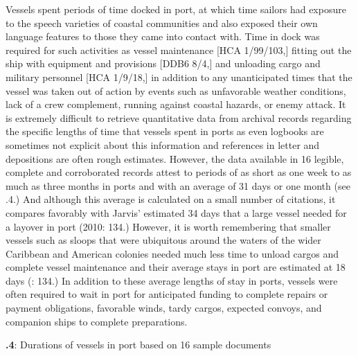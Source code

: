 Vessels spent periods of time docked in port, at which time sailors had exposure to the speech varieties of coastal communities and also exposed their own language features to those they came into contact with. Time in dock was required for such activities as vessel maintenance [HCA 1/99/103,] fitting out the ship with equipment and provisions [DDB6 8/4,] and unloading cargo and military personnel [HCA 1/9/18,] in addition to any unanticipated times that the vessel was taken out of action by events such as unfavorable weather conditions, lack of a crew complement, running against coastal hazards, or enemy attack. It is extremely difficult to retrieve quantitative data from archival records regarding the specific lengths of time that vessels spent in ports as even logbooks are sometimes not explicit about this information and references in letter and depositions are often rough estimates. However, the data available in 16 legible, complete and corroborated records attest to periods of as short as one week to as much as three months in ports and with an average of 31 days or one month (see .4.) And although this average is calculated on a small number of citations, it compares favorably with Jarvis’ estimated 34 days that a large vessel needed for a layover in port (2010: 134.) However, it is worth remembering that smaller vessels such as sloops that were ubiquitous around the waters of the wider Caribbean and American colonies needed much less time to unload cargos and complete vessel maintenance and their average stays in port are estimated at 18 days (\citealt{Jarvis2010}: 134.) In addition to these average lengths of stay in ports, vessels were often required to wait in port for anticipated funding to complete repairs or payment obligations, favorable winds, tardy cargos, expected convoys, and companion ships to complete preparations. 

\textbf{.4}: Durations of vessels in port based on 16 sample documents

